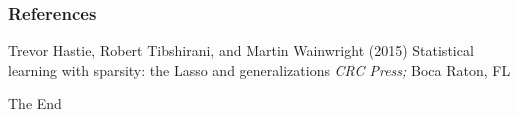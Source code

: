 \documentclass{beamer}
\begin{document}
\begin{frame}
\frametitle{References}
\footnotesize{
\begin{thebibliography}{99} %
 Trevor Hastie, Robert Tibshirani, and Martin Wainwright (2015)
\newblock Statistical learning with sparsity: the Lasso and
generalizations
\newblock \emph{CRC Press;} Boca Raton, FL%
\end{thebibliography}
}
\end{frame}


\begin{frame}
\Huge{\centerline{The End}}
\end{frame}





\end{document}

